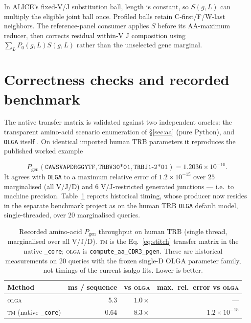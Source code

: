 \documentclass[11pt]{article}
\theoremstyle{oldplain}
\theoremstyle{oldrem}
\newcommand{\Pgen}{P_{\mathrm{gen}}}
\begin{document}
In ALICE's fixed-V/J substitution ball, length is constant, so $S(g,L)$ can
multiply the eligible joint ball once. Profiled balls retain C-first/F/W-last
neighbors. The reference-panel consumer applies $S$ before its AA-maximum
reducer, then corrects residual within-V J composition using
$\sum_L P_0(g,L)S(g,L)$ rather than the unselected gene marginal.

\section{Correctness checks and recorded benchmark}\label{sec:bench}

The native transfer matrix is validated against two independent oracles: the transparent
amino-acid scenario enumeration of \S\ref{sec:aa} (pure Python), and \texttt{OLGA} itself
\cite{Sethna2019}. On identical imported human TRB parameters it reproduces the published worked example

\begin{equation*}
 \Pgen(\texttt{CAWSVAPDRGGYTF},\texttt{TRBV30*01},\texttt{TRBJ1-2*01})
 =1.2036\times10^{-10}.
\end{equation*}
It agrees
with \texttt{OLGA} to a maximum relative error of $1.2\times10^{-15}$ over $25$ marginalised (all V/J/D)
and $6$ V/J-restricted generated junctions --- i.e.\ to machine precision. Table~\ref{tab:bench} reports
historical timing, whose producer now resides in the separate benchmark project as
 on the human TRB \texttt{OLGA} default model,
single-threaded, over $20$ marginalised queries.

\begin{table}[htbp]\centering
\caption{Recorded amino-acid $\Pgen$ throughput on human TRB (single thread, marginalised over all V/J/D).
\textsc{tm} is the Eq.~\eqref{eq:stitch} transfer matrix in the native \texttt{\_core}; \textsc{olga} is
\texttt{compute\_aa\_CDR3\_pgen}. These are historical measurements on
20 queries with the frozen single-D OLGA parameter family, not timings of the
current isalgo fits. Lower is better.}\label{tab:bench}
\footnotesize
\begin{tabular}{lrrr}\toprule
Method & ms / sequence & vs \textsc{olga} & max.\ rel.\ error vs \textsc{olga} \\\midrule
\textsc{olga}               & $5.3$          & $1.0\times$                   & --- \\
\textsc{tm} (native \texttt{\_core}) & $\mathbf{0.64}$ & $\mathbf{8.3\times}$ & $1.2\times10^{-15}$ \\
\bottomrule\end{tabular}
\end{table}
\end{document}

